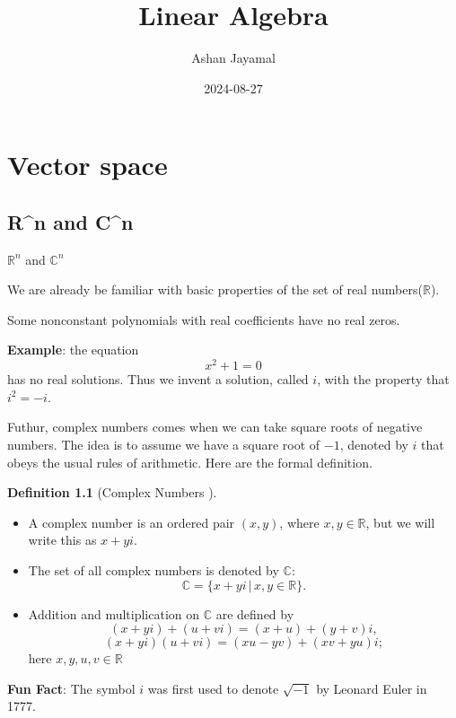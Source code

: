 \documentclass[
]{book}
\title{Linear Algebra}
\author{Ashan Jayamal}
\date{2024-08-27}
\providecommand{\tightlist}{%
  \setlength{\itemsep}{0pt}\setlength{\parskip}{0pt}}
\theoremstyle{definition}
\newtheorem{definition}{Definition}[chapter]
\theoremstyle{definition}
\theoremstyle{definition}
\theoremstyle{definition}
\theoremstyle{remark}
\begin{document}
\maketitle

{
\setcounter{tocdepth}{1}
\tableofcontents
}
\chapter{Vector space}\label{vector-space}

\section{R\^{}n and C\^{}n}\label{rn-and-cn}

\(\mathbb{R}^n\) and \(\mathbb{C}^n\)

We are already be familiar with basic properties of the set of real numbers(\(\mathbb{R}\)).

Some nonconstant polynomials with real coefficients have no real
zeros.

\textbf{Example}: the equation
\[x^2+1=0\]
has no real solutions.
Thus we invent a solution, called \(i\), with the property that \(i^2 = -i\).

Futhur, complex numbers comes when we can take square roots of negative numbers. The idea is to assume we have a square root of \(−1\), denoted by \(i\) that obeys the usual rules of arithmetic. Here are the formal definition.

\begin{definition}[Complex Numbers ]
\protect\hypertarget{def:unnamed-chunk-1}{}\label{def:unnamed-chunk-1}\leavevmode

\begin{itemize}
\tightlist
\item
  A complex number is an ordered pair \((x, y)\), where \(x, y \in \mathbb{R}\), but we will write this as \(x + yi\).
\item
  The set of all complex numbers is denoted by \(\mathbb{C}\):
  \[\mathbb{C} = \{x + yi \,|\, x, y \in \mathbb{R}\}.\]
\item
  Addition and multiplication on \(\mathbb{C}\) are defined by
  \[(x + yi) + (u + vi) = (x + u) + (y + v)i,\]
  \[(x + yi)(u + vi) = (xu - yv) + (xv + yu)i;\]
  here \(x, y, u, v \in \mathbb{R}\)
\end{itemize}

\end{definition}

\textbf{Fun Fact}: The symbol \(i\) was first used to denote \(\sqrt{-1}\) by Leonard Euler in 1777.
\end{document}
